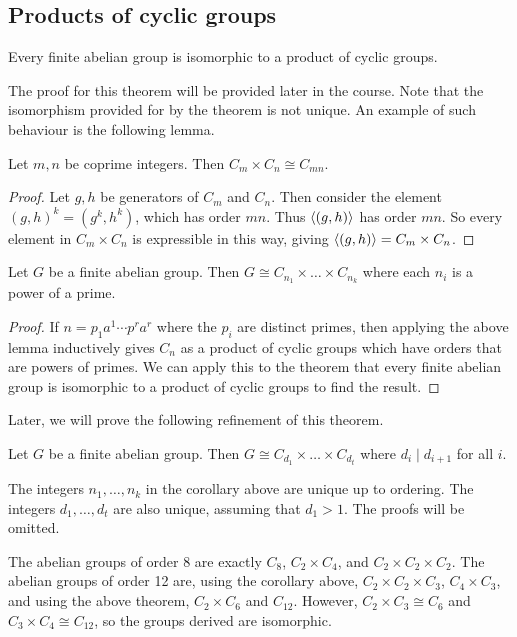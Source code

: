 \subsection{Products of cyclic groups}
\begin{theorem}
	Every finite abelian group is isomorphic to a product of cyclic groups.
\end{theorem}
The proof for this theorem will be provided later in the course.
Note that the isomorphism provided for by the theorem is not unique.
An example of such behaviour is the following lemma.
\begin{lemma}
	Let \( m, n \) be coprime integers.
	Then \( C_m \times C_n \cong C_{mn} \).
\end{lemma}
\begin{proof}
	Let \( g, h \) be generators of \( C_m \) and \( C_n \).
	Then consider the element \( (g, h)^k = (g^k, h^k) \), which has order \( mn \).
	Thus \( \langle{} (g,h) \rangle \) has order \( mn \).
	So every element in \( C_m \times C_n \) is expressible in this way, giving \( \langle{} (g,h) \rangle = C_m \times C_n \).
\end{proof}
\begin{corollary}
	Let \( G \) be a finite abelian group.
	Then \( G \cong C_{n_1} \times \dots \times C_{n_k} \) where each \( n_i \) is a power of a prime.
\end{corollary}
\begin{proof}
	If \( n = p_1 a^1 \cdots p^r a^r \) where the \( p_i \) are distinct primes, then applying the above lemma inductively gives \( C_n \) as a product of cyclic groups which have orders that are powers of primes.
	We can apply this to the theorem that every finite abelian group is isomorphic to a product of cyclic groups to find the result.
\end{proof}
Later, we will prove the following refinement of this theorem.
\begin{theorem}
	Let \( G \) be a finite abelian group.
	Then \( G \cong C_{d_1} \times \dots \times C_{d_t} \) where \( d_i \mid d_{i+1} \) for all \( i \).
\end{theorem}
\begin{remark}
	The integers \( n_1, \dots, n_k \) in the corollary above are unique up to ordering.
	The integers \( d_1, \dots, d_t \) are also unique, assuming that \( d_1 > 1 \).
	The proofs will be omitted.
\end{remark}
\begin{example}
	The abelian groups of order 8 are exactly \( C_8 \), \( C_2 \times C_4 \), and \( C_2 \times C_2 \times C_2 \).
	The abelian groups of order 12 are, using the corollary above, \( C_2 \times C_2 \times C_3 \), \( C_4 \times C_3 \), and using the above theorem, \( C_2 \times C_6 \) and \( C_{12} \).
	However, \( C_2 \times C_3 \cong C_6 \) and \( C_3 \times C_4 \cong C_{12} \), so the groups derived are isomorphic.
\end{example}
